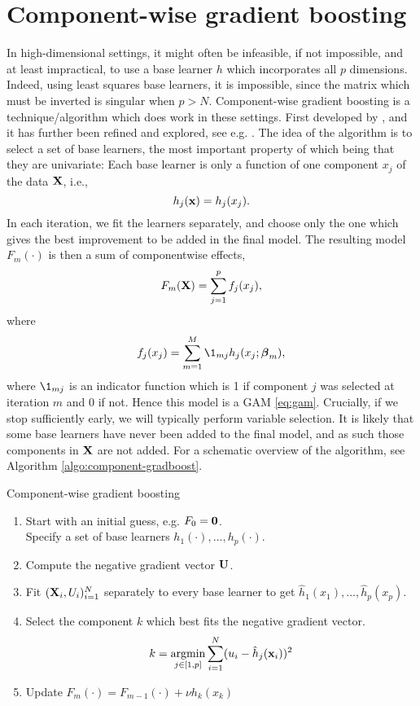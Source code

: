 \section{Component-wise gradient boosting}
In high-dimensional settings, it might often be infeasible, if not impossible, and at least impractical, to use a base learner $h$ which incorporates all $p$ dimensions. Indeed, using least squares base learners, it is impossible, since the matrix which must be inverted is singular when $p>N$. Component-wise gradient boosting is a technique/algorithm which does work in these settings. First developed by \citet{buhlmann-yu}, and it has further been refined and explored, see e.g. \citet{buhlmann2006}. The idea of the algorithm is to select a set of base learners, the most important property of which being that they are univariate: Each base learner is only a function of one component $x_j$ of the data $\mathbf{X}$, i.e.,
\begin{equation*}
    h_j(\mathbf{x})=h_j(x_j).
\end{equation*}
In each iteration, we fit the learners separately, and choose only the one which gives the best improvement to be added in the final model. The resulting model $F_m(\cdot)$ is then a sum of componentwise effects,
\begin{equation*}
    F_m(\mathbf{X})=\sum_{j=1}^pf_j(x_j),
\end{equation*}
where
\begin{equation*}
    f_j(x_j)=\sum_{m=1}^M\1_{mj}h_j(x_j;\bbeta_m),
\end{equation*}
where $\1_{mj}$ is an indicator function which is 1 if component $j$ was selected at iteration $m$ and 0 if not.
Hence this model is a GAM \eqref{eq:gam}. Crucially, if we stop sufficiently early, we will typically perform variable selection. It is likely that some base learners have never been added to the final model, and as such those components in $\mathbf{X}$ are not added. For a schematic overview of the algorithm, see Algorithm \ref{algo:component-gradboost}.
\begin{algorithm}
\caption{Component-wise gradient boosting}
\label{algo:component-gradboost}
\begin{enumerate}
    \item Start with an initial guess, e.g. $F_0=\mathbf{0}$.\\
    Specify a set of base learners $h_1(\cdot),\dotsc,h_p(\cdot)$.
    \item Compute the negative gradient vector $\mathbf{U}$.
    \item Fit $(\mathbf{X}_i,U_i)_{i=1}^N$ separately to every base learner to get $\hat{h}_1(x_1),\dotsc,\hat{h}_p(x_p)$.
    \item Select the component $k$ which best fits the negative gradient vector.
        \begin{equation*}
            k=\operatorname*{argmin}_{j\in[1,p]}\sum_{i=1}^N(u_i-\hat{h}_j(\mathbf{x}_i))^2
        \end{equation*}
    \item Update $F_m(\cdot)=F_{m-1}(\cdot)+\nu h_k(x_k)$
\end{enumerate}
\end{algorithm}
